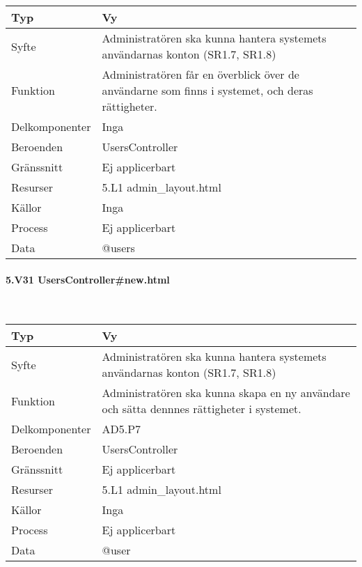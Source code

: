 \documentclass[a4paper, twoside, 11pt, titlepage]{article}
\begin{document}
			\begin {table} [ht] \begin{tabular} {  p{3.5cm} p{9.6cm} }
				\hline
				{Typ} & {Vy} \\
				\hline
				{Syfte} & {Administratören ska kunna hantera systemets användarnas konton (SR1.7, SR1.8)} \\
				\hline
				{Funktion} & {Administratören får en överblick över de användarne som finns i systemet, och deras rättigheter.} \\
				\hline
				{Delkomponenter} & {Inga} \\
				\hline
				{Beroenden} & {UsersController} \\
				\hline
				{Gränssnitt} & {Ej applicerbart} \\
				\hline
				{Resurser} & {5.L1 admin\_layout.html} \\
				\hline
				{Källor} & {Inga} \\
				\hline
				{Process} & {Ej applicerbart} \\
				\hline
				{Data} & {@users} \\
				\hline
			\end{tabular} \end{table} \FloatBarrier


			\paragraph{5.V31 UsersController\#new.html}\

			\begin {table} [ht] \begin{tabular} {  p{3.5cm} p{9.6cm} }
				\hline
				{Typ} & {Vy} \\
				\hline
				{Syfte} & {Administratören ska kunna hantera systemets användarnas konton (SR1.7, SR1.8)} \\
				\hline
				{Funktion} & {Administratören ska kunna skapa en ny användare och sätta dennnes rättigheter i systemet.} \\
				\hline
				{Delkomponenter} & {AD5.P7} \\
				\hline
				{Beroenden} & {UsersController} \\
				\hline
				{Gränssnitt} & {Ej applicerbart} \\
				\hline
				{Resurser} & {5.L1 admin\_layout.html} \\
				\hline
				{Källor} & {Inga} \\
				\hline
				{Process} & {Ej applicerbart} \\
				\hline
				{Data} & {@user} \\
				\hline
			\end{tabular} \end{table} \FloatBarrier
\end{document}
